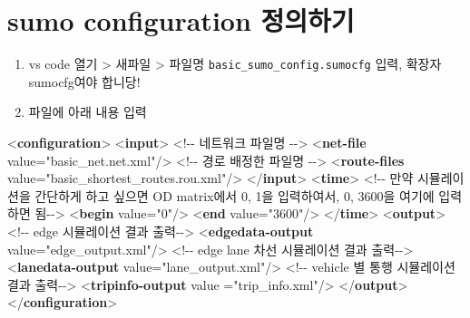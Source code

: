 \documentclass[
  letterpaper,
  DIV=11,
  numbers=noendperiod]{scrreprt}
\newenvironment{Shaded}{\begin{snugshade}}{\end{snugshade}}
\newcommand{\CommentTok}[1]{\textcolor[rgb]{0.37,0.37,0.37}{#1}}
\newcommand{\KeywordTok}[1]{\textcolor[rgb]{0.00,0.23,0.31}{\textbf{#1}}}
\newcommand{\NormalTok}[1]{\textcolor[rgb]{0.00,0.23,0.31}{#1}}
\newcommand{\OtherTok}[1]{\textcolor[rgb]{0.00,0.23,0.31}{#1}}
\newcommand{\StringTok}[1]{\textcolor[rgb]{0.13,0.47,0.30}{#1}}
\begin{document}
\section{sumo configuration
정의하기}\label{sumo-configuration-uxc815uxc758uxd558uxae30}

\begin{enumerate}
\def\labelenumi{\arabic{enumi}.}
\item
  vs code 열기 \textgreater{} 새파일 \textgreater{} 파일명
  \texttt{basic\_sumo\_config.sumocfg} 입력, 확장자 sumocfg여야 합니당!
\item
  파일에 아래 내용 입력
\end{enumerate}

\begin{Shaded}
\begin{Highlighting}[]
\NormalTok{\textless{}}\KeywordTok{configuration}\NormalTok{\textgreater{}}
\NormalTok{    \textless{}}\KeywordTok{input}\NormalTok{\textgreater{} }
    \CommentTok{\textless{}!{-}{-} 네트워크 파일명 {-}{-}\textgreater{}}
\NormalTok{        \textless{}}\KeywordTok{net{-}file} \OtherTok{value=}\StringTok{"basic\_net.net.xml"}\NormalTok{/\textgreater{} }
    \CommentTok{\textless{}!{-}{-} 경로 배정한 파일명 {-}{-}\textgreater{}}
\NormalTok{        \textless{}}\KeywordTok{route{-}files} \OtherTok{value=}\StringTok{"basic\_shortest\_routes.rou.xml"}\NormalTok{/\textgreater{} }
\NormalTok{    \textless{}/}\KeywordTok{input}\NormalTok{\textgreater{} }
\NormalTok{    \textless{}}\KeywordTok{time}\NormalTok{\textgreater{} }
    \CommentTok{\textless{}!{-}{-} 만약 시뮬레이션을 간단하게 하고 싶으면 OD matrix에서 0, 1을 입력하여서, 0, 3600을 여기에 입력하면 됨{-}{-}\textgreater{}}
\NormalTok{        \textless{}}\KeywordTok{begin} \OtherTok{value=}\StringTok{"0"}\NormalTok{/\textgreater{} }
\NormalTok{        \textless{}}\KeywordTok{end} \OtherTok{value=}\StringTok{"3600"}\NormalTok{/\textgreater{} }
\NormalTok{    \textless{}/}\KeywordTok{time}\NormalTok{\textgreater{}}
\NormalTok{    \textless{}}\KeywordTok{output}\NormalTok{\textgreater{}}
    \CommentTok{\textless{}!{-}{-} edge 시뮬레이션 결과 출력{-}{-}\textgreater{}}
\NormalTok{        \textless{}}\KeywordTok{edgedata{-}output} \OtherTok{value=}\StringTok{"edge\_output.xml"}\NormalTok{/\textgreater{}}
    \CommentTok{\textless{}!{-}{-} edge lane 차선 시뮬레이션 결과 출력{-}{-}\textgreater{}}
\NormalTok{        \textless{}}\KeywordTok{lanedata{-}output} \OtherTok{value=}\StringTok{"lane\_output.xml"}\NormalTok{/\textgreater{}}
    \CommentTok{\textless{}!{-}{-} vehicle 별 통행 시뮬레이션 결과 출력{-}{-}\textgreater{}}
\NormalTok{        \textless{}}\KeywordTok{tripinfo{-}output} \OtherTok{value} \OtherTok{=}\StringTok{"trip\_info.xml"}\NormalTok{/\textgreater{}}
\NormalTok{    \textless{}/}\KeywordTok{output}\NormalTok{\textgreater{}}
\NormalTok{\textless{}/}\KeywordTok{configuration}\NormalTok{\textgreater{}}
\end{Highlighting}
\end{Shaded}
\end{document}
